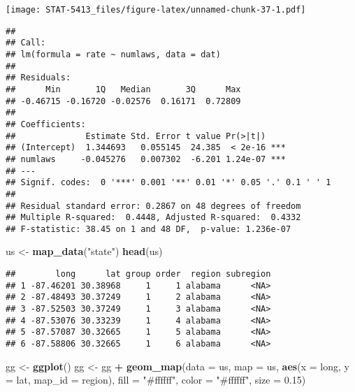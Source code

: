 \documentclass[]{book}
\newenvironment{Shaded}{\begin{snugshade}}{\end{snugshade}}
\newcommand{\DataTypeTok}[1]{\textcolor[rgb]{0.13,0.29,0.53}{#1}}
\newcommand{\FloatTok}[1]{\textcolor[rgb]{0.00,0.00,0.81}{#1}}
\newcommand{\KeywordTok}[1]{\textcolor[rgb]{0.13,0.29,0.53}{\textbf{#1}}}
\newcommand{\NormalTok}[1]{#1}
\newcommand{\OperatorTok}[1]{\textcolor[rgb]{0.81,0.36,0.00}{\textbf{#1}}}
\newcommand{\StringTok}[1]{\textcolor[rgb]{0.31,0.60,0.02}{#1}}
\begin{document}
\texttt{[image: STAT-5413\_files/figure-latex/unnamed-chunk-37-1.pdf]}

\begin{Shaded}
\end{Shaded}

\begin{verbatim}
## 
## Call:
## lm(formula = rate ~ numlaws, data = dat)
## 
## Residuals:
##      Min       1Q   Median       3Q      Max 
## -0.46715 -0.16720 -0.02576  0.16171  0.72809 
## 
## Coefficients:
##              Estimate Std. Error t value Pr(>|t|)    
## (Intercept)  1.344693   0.055145  24.385  < 2e-16 ***
## numlaws     -0.045276   0.007302  -6.201 1.24e-07 ***
## ---
## Signif. codes:  0 '***' 0.001 '**' 0.01 '*' 0.05 '.' 0.1 ' ' 1
## 
## Residual standard error: 0.2867 on 48 degrees of freedom
## Multiple R-squared:  0.4448, Adjusted R-squared:  0.4332 
## F-statistic: 38.45 on 1 and 48 DF,  p-value: 1.236e-07
\end{verbatim}

\begin{Shaded}
\begin{Highlighting}[]
\NormalTok{us <-}\StringTok{ }\KeywordTok{map_data}\NormalTok{(}\StringTok{"state"}\NormalTok{)}
\KeywordTok{head}\NormalTok{(us)}
\end{Highlighting}
\end{Shaded}

\begin{verbatim}
##        long      lat group order  region subregion
## 1 -87.46201 30.38968     1     1 alabama      <NA>
## 2 -87.48493 30.37249     1     2 alabama      <NA>
## 3 -87.52503 30.37249     1     3 alabama      <NA>
## 4 -87.53076 30.33239     1     4 alabama      <NA>
## 5 -87.57087 30.32665     1     5 alabama      <NA>
## 6 -87.58806 30.32665     1     6 alabama      <NA>
\end{verbatim}

\begin{Shaded}
\begin{Highlighting}[]
\NormalTok{gg <-}\StringTok{ }\KeywordTok{ggplot}\NormalTok{()}
\NormalTok{gg <-}\StringTok{ }\NormalTok{gg }\OperatorTok{+}\StringTok{ }\KeywordTok{geom_map}\NormalTok{(}\DataTypeTok{data =}\NormalTok{ us, }\DataTypeTok{map =}\NormalTok{ us,}
                    \KeywordTok{aes}\NormalTok{(}\DataTypeTok{x =}\NormalTok{ long, }\DataTypeTok{y =}\NormalTok{ lat, }\DataTypeTok{map_id =}\NormalTok{ region),}
                    \DataTypeTok{fill =} \StringTok{"#ffffff"}\NormalTok{, }\DataTypeTok{color =} \StringTok{"#ffffff"}\NormalTok{, }\DataTypeTok{size =} \FloatTok{0.15}\NormalTok{)}
\end{Highlighting}
\end{Shaded}
\end{document}
